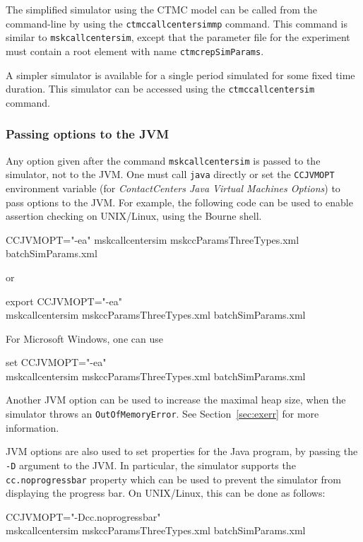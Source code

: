 The simplified simulator using the CTMC model can be called from the
command-line by using the \texttt{ctmccallcentersimmp} command.
This command is similar to \texttt{mskcallcentersim}, except that the
parameter file for the experiment must contain a root element with
name \texttt{ctmcrep\-Sim\-Params}.

A simpler simulator is available for a single period simulated for
some fixed time duration.  This simulator can be accessed using the
\texttt{ctmccallcentersim} command.

\subsubsection{Passing options to the JVM}

Any option given after the command \texttt{mskcallcentersim} is passed
to the simulator, not to the JVM. One must call \texttt{java}
directly or  set the \texttt{CCJVMOPT}
environment variable (for \emph{ContactCenters Java Virtual Machines
  Options}) to pass options to the JVM.
For example, the following code can be used to enable assertion
checking on UNIX/Linux, using the Bourne shell.

{\noindent\ttfamily
CCJVMOPT="-ea" mskcallcentersim mskccParamsThreeTypes.xml batchSimParams.xml
}

or

{\noindent\ttfamily
export CCJVMOPT="-ea"\\
mskcallcentersim mskccParamsThreeTypes.xml batchSimParams.xml
}

For Microsoft Windows, one can use

{\noindent\ttfamily
set CCJVMOPT="-ea"\\
mskcallcentersim mskccParamsThreeTypes.xml batchSimParams.xml
}

Another JVM option can be used to increase the maximal heap size,
when the simulator throws  an \texttt{Out\-Of\-Memory\-Error}.
See Section~\ref{sec:exerr} for more information.

JVM options are also used to set properties for the Java program, by
passing the \texttt{-D} argument to the JVM.
In particular, the simulator supports the \texttt{cc.noprogressbar}
property which can be used to prevent the simulator
from displaying the progress bar. On UNIX/Linux, this can be done as follows:

{\noindent\ttfamily
CCJVMOPT="-Dcc.noprogressbar"\\
mskcallcentersim mskccParamsThreeTypes.xml batchSimParams.xml
}

